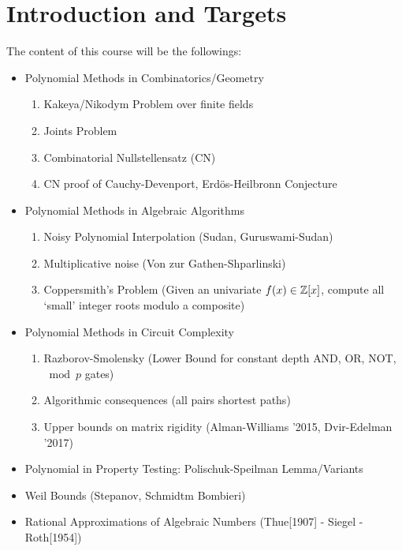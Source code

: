 \documentclass[twoside]{article}
\begin{document}
\section{Introduction and Targets}
The content of this course will be the followings:
\begin{itemize}[label=$\bullet$]
	\item Polynomial Methods in Combinatorics/Geometry
	\begin{enumerate}
		\item Kakeya/Nikodym Problem over finite fields
		\item Joints Problem
		\item Combinatorial Nullstellensatz (CN)
		\item CN proof of Cauchy-Devenport, Erd\"{o}s-Heilbronn Conjecture
	\end{enumerate}
	\item Polynomial Methods in Algebraic Algorithms
	\begin{enumerate}
		\item Noisy Polynomial Interpolation (Sudan, Guruswami-Sudan)
		\item Multiplicative noise (Von zur Gathen-Shparlinski)
		\item Coppersmith's Problem (Given an univariate $f(x)\in\mathbb{Z}[x]$, compute all `small' integer roots modulo a composite)
	\end{enumerate}
	\item Polynomial Methods in Circuit Complexity
	\begin{enumerate}
		\item Razborov-Smolensky (Lower Bound for constant depth \textsc{AND}, \textsc{OR}, \textsc{NOT}, $\bmod p$ gates)
		\item Algorithmic consequences (all pairs shortest paths)
		\item Upper bounds on matrix rigidity (Alman-Williams '2015, Dvir-Edelman '2017)
	\end{enumerate}
	\item Polynomial in Property Testing: Polischuk-Speilman Lemma/Variants
	\item Weil Bounds (Stepanov, Schmidtm Bombieri)
	\item Rational Approximations of Algebraic Numbers (Thue[1907] - Siegel - Roth[1954])
\end{itemize}















\newpage



\end{document}
